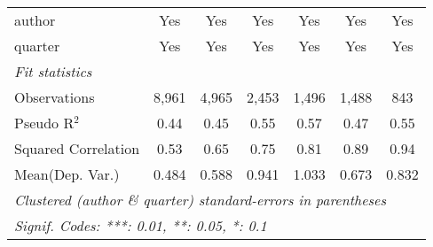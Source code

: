\begin{tabular}{lcccccc}
   author                                                     & Yes          & Yes          & Yes           & Yes           & Yes          & Yes\\  
   quarter                                                    & Yes          & Yes          & Yes           & Yes           & Yes          & Yes\\  
   \midrule
   \emph{Fit statistics}\\
   Observations                                               & 8,961        & 4,965        & 2,453         & 1,496         & 1,488        & 843\\  
   Pseudo R$^2$                                               & 0.44         & 0.45         & 0.55          & 0.57          & 0.47         & 0.55\\  
   Squared Correlation                                        & 0.53         & 0.65         & 0.75          & 0.81          & 0.89         & 0.94\\  
Mean(Dep. Var.) & 0.484 & 0.588 & 0.941 & 1.033 & 0.673 & 0.832 \\
   \midrule \midrule
   \multicolumn{7}{l}{\emph{Clustered (author \& quarter) standard-errors in parentheses}}\\
   \multicolumn{7}{l}{\emph{Signif. Codes: ***: 0.01, **: 0.05, *: 0.1}}\\
\end{tabular}
\par\endgroup
